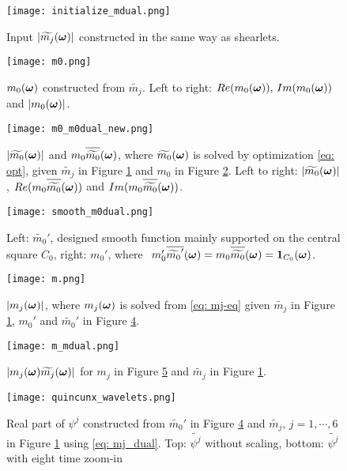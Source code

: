 \begin{figure}
\centering
\texttt{[image: initialize\_mdual.png]}
\caption{ Input $|\widetilde{m_{j}}(\boldsymbol{\omega})|$ constructed in the same way as shearlets.}
\label{fig: mjdual}
\end{figure}

\begin{figure}
\centering
\texttt{[image: m0.png]}
\caption{ $m_0(\boldsymbol{\omega})$ constructed from $\widetilde{m_j}$. Left to right: $Re(m_0(\boldsymbol{\omega})),\, Im(m_0(\boldsymbol{\omega}))$ and $|m_0(\boldsymbol{\omega})|$.}
\label{fig: m_0}
\end{figure}

\begin{figure}
\centering
\texttt{[image: m0\_m0dual\_new.png]}
\caption{$|\widetilde{m_{0}}(\boldsymbol{\omega})|$ and $m_0\sbarm{0}$, where $\widetilde{m_{0}}(\boldsymbol{\omega})$ is solved by optimization \eqref{eq: opt}, given $\widetilde{m_j}$ in Figure \ref{fig: mjdual} and $m_0$ in Figure \ref{fig: m_0}. Left to right: $|\widetilde{m_{0}}(\boldsymbol{\omega})|$, $Re(m_0\sbarm{0})$ and $Im(m_0\sbarm{0})$. }
\label{fig: m_0_m0dual}
\end{figure}

\begin{figure}
\centering
\texttt{[image: smooth\_m0dual.png]}
\caption{ Left: $\widetilde{m_0}'$, designed smooth function mainly supported on the central square $C_0$, right: $m_0'$, where $\;\, m_0'\overline{\widetilde{m_0}'}(\V{\omega})  =  m_0\sbarm{0}= \V{1}_{C_0}(\V{\omega})$. } 
\label{fig: smooth_m0dual}
\end{figure}

\begin{figure}
\centering
\texttt{[image: m.png]}
\caption{ $|m_j(\boldsymbol{\omega})|$, where $m_j(\boldsymbol{\omega})$ is solved from \eqref{eq: mj-eq} given $\widetilde{m_j}$ in Figure \ref{fig: mjdual}, $m_0'$ and $\widetilde{m_0}'$ in Figure \ref{fig: smooth_m0dual}. }
\label{fig: m_j}
\end{figure}

\begin{figure}
\centering
\texttt{[image: m\_mdual.png]}
\caption{ $|m_j(\boldsymbol{\omega})\widetilde{m_{j}}(\boldsymbol{\omega})|$ for $m_j$ in Figure \ref{fig: m_j} and $\widetilde{m_j}$ in Figure \ref{fig: mjdual}. }
\label{fig: m_j_mjdual}
\end{figure}

\begin{figure}
\centering
\texttt{[image: quincunx\_wavelets.png]}
\caption{ Real part of $\psi^j$ constructed from $\widetilde{m_0}'$ in Figure \ref{fig: smooth_m0dual} and $\widetilde{m_j},\, j=1,\cdots, 6$ in Figure \ref{fig: mjdual} using \eqref{eq: mj_dual}. Top: $\widetilde{\psi^j}$ without scaling, bottom: $\widetilde{\psi^j}$ with eight time zoom-in } 
\label{fig: wavelets}
\end{figure}


